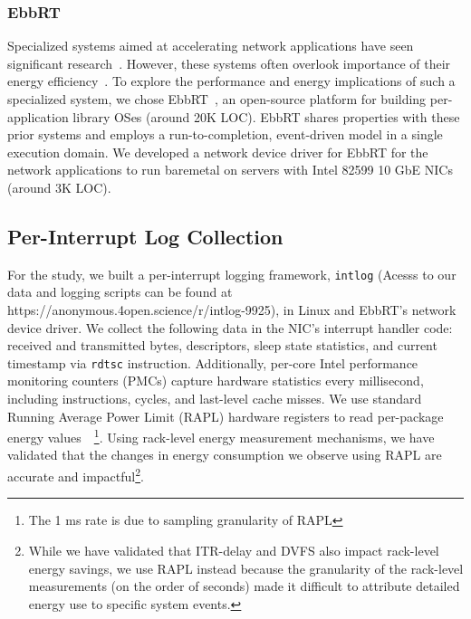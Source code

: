 \subsubsection{EbbRT}
Specialized systems aimed at accelerating network applications have seen significant research~\cite{ix, arrakis, zygos, shenango, rumpkernel, aliraza, unikernels, scalingmcdfacebook, arachne, mtcp, sandstorm, affinityaccept, flexnic, mica, seda, ebbrt}. However, these systems often overlook importance of their energy efficiency~\cite{SmoothOperator, Dynamo, nature1}. To explore the performance and energy implications of such a specialized system, we chose EbbRT~\cite{ebbrt}, an open-source platform for building per-application library OSes (around 20K LOC). EbbRT shares properties with these prior systems and employs a run-to-completion, event-driven model in a single execution domain. We developed a network device driver for EbbRT for the network applications to run baremetal on servers with Intel 82599 10 GbE NICs~\cite{82599} (around 3K LOC).

\subsection{Per-Interrupt Log Collection}
For the study, we built a per-interrupt logging framework, \texttt{intlog} (Acesss to our data and logging scripts can be found at https://anonymous.4open.science/r/intlog-9925), in Linux and EbbRT's network device driver. We collect the following data in the NIC's interrupt handler code: received and transmitted bytes, descriptors, sleep state statistics, and current timestamp via \texttt{rdtsc} instruction. Additionally, per-core Intel performance monitoring counters (PMCs) capture hardware statistics every millisecond, including instructions, cycles, and last-level cache misses. We use standard Running Average Power Limit (RAPL) hardware registers to read per-package energy values~\cite{intel_rapl}~\footnote{The 1 ms rate is due to sampling granularity of RAPL}. Using rack-level energy measurement mechanisms, we have validated that the changes in energy consumption we observe using RAPL are accurate and impactful\footnote{While we have validated that ITR-delay and DVFS also impact rack-level energy savings, we use RAPL instead because the granularity of the rack-level measurements (on the order of seconds) made it difficult to attribute detailed energy use to specific system events.}.

